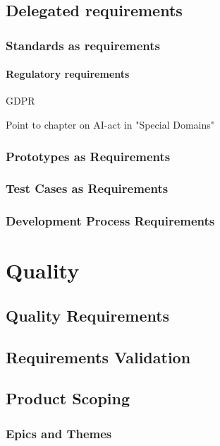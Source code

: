 \documentclass{reqengbook}
\begin{document}
\chapter{Delegated requirements}

\section{Standards as requirements}

\subsection{Regulatory requirements}

GDPR 

Point to chapter on AI-act in "Special Domains"

\section{Prototypes as Requirements}

\section{Test Cases as Requirements}

\section{Development Process Requirements}


\part{Quality}

\chapter{Quality Requirements}

\chapter{Requirements Validation}

\chapter{Product Scoping}

\section{Epics and Themes}
\end{document}
